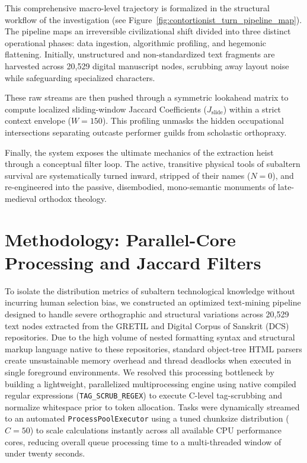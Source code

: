 \documentclass[11pt,twoside,letterpaper]{article}
\begin{document}
This comprehensive macro-level trajectory is formalized in the structural workflow of the investigation (see Figure~\ref{fig:contortionist_turn_pipeline_map}). The pipeline maps an irreversible civilizational shift divided into three distinct operational phases: data ingestion, algorithmic profiling, and hegemonic flattening. Initially, unstructured and non-standardized text fragments are harvested across 20,529 digital manuscript nodes, scrubbing away layout noise while safeguarding specialized characters. 

These raw streams are then pushed through a symmetric lookahead matrix to compute localized sliding-window Jaccard Coefficients ($J_{\text{slide}}$) within a strict context envelope ($W = 150$). This profiling unmasks the hidden occupational intersections separating outcaste performer guilds from scholastic orthopraxy. 

Finally, the system exposes the ultimate mechanics of the extraction heist through a conceptual filter loop. The active, transitive physical tools of subaltern survival are systematically turned inward, stripped of their names ($N = 0$), and re-engineered into the passive, disembodied, mono-semantic monuments of late-medieval orthodox theology.


\section{Methodology: Parallel-Core Processing and Jaccard Filters}
To isolate the distribution metrics of subaltern technological knowledge without incurring human selection bias, we constructed an optimized text-mining pipeline designed to handle severe orthographic and structural variations across 20,529 text nodes extracted from the GRETIL and Digital Corpus of Sanskrit (DCS) repositories. Due to the high volume of nested formatting syntax and structural markup language native to these repositories, standard object-tree HTML parsers create unsustainable memory overhead and thread deadlocks when executed in single foreground environments. We resolved this processing bottleneck by building a lightweight, parallelized multiprocessing engine using native compiled regular expressions (\texttt{TAG\_SCRUB\_REGEX}) to execute C-level tag-scrubbing and normalize whitespace prior to token allocation. Tasks were dynamically streamed to an automated \texttt{ProcessPoolExecutor} using a tuned chunksize distribution ($C = 50$) to scale calculations instantly across all available CPU performance cores, reducing overall queue processing time to a multi-threaded window of under twenty seconds.
\end{document}
